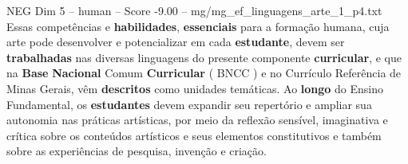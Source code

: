 \begin{textsample}{NEG Dim 5 – human – Score -9.00 – mg/mg\_ef\_linguagens\_arte\_1\_p4.txt}  \label{ex:f5_neg_014}
Essas competências e \textbf{habilidades}, \textbf{essenciais} para a formação humana, cuja arte pode desenvolver e potencializar em cada \textbf{estudante}, devem ser \textbf{trabalhadas} nas diversas linguagens do presente componente \textbf{curricular}, e que na \textbf{Base} \textbf{Nacional} Comum \textbf{Curricular} ( BNCC ) e no Currículo Referência de Minas Gerais, vêm \textbf{descritos} como unidades temáticas.
Ao \textbf{longo} do Ensino Fundamental, os \textbf{estudantes} devem expandir seu repertório e ampliar sua autonomia nas práticas artísticas, por meio da reflexão sensível, imaginativa e crítica sobre os conteúdos artísticos e seus elementos constitutivos e também sobre as experiências de pesquisa, invenção e criação.

\end{textsample}
